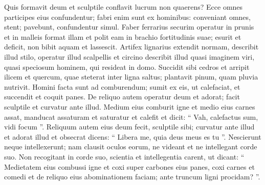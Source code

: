 \begin{biblechapter}
\begin{biblechapter}
\begin{biblechapter}
\begin{biblechapter}
\begin{biblechapter}
\begin{biblechapter}
\begin{biblechapter}
\begin{biblechapter}
\begin{biblechapter}
\begin{biblechapter}
\begin{biblechapter}
\begin{biblechapter}
\begin{biblechapter}
\begin{biblechapter}
\begin{biblechapter}
\begin{biblechapter}
\begin{biblechapter}
\begin{biblechapter}
\begin{biblechapter}
\begin{biblechapter}
\begin{biblechapter}
\begin{biblechapter}
\begin{biblechapter}
\begin{biblechapter}
\begin{biblechapter}
\begin{biblechapter}
\begin{biblechapter}
\begin{biblechapter}
\begin{biblechapter}
\begin{biblechapter}
\begin{biblechapter}
\begin{biblechapter}
\begin{biblechapter}
\begin{biblechapter}
\begin{biblechapter}
\begin{biblechapter}
\begin{biblechapter}
\begin{biblechapter}
\begin{biblechapter}
\begin{biblechapter}
\begin{biblechapter}
\begin{biblechapter}
\begin{biblechapter}
\begin{biblechapter}
\verse Quis formavit deum et sculptile conflavit lucrum non quaerens? 
\verse Ecce omnes participes eius confundentur; fabri enim sunt ex hominibus: conveniant omnes, stent; pavebunt, confundentur simul. 
\verse Faber ferrarius securim operatur in prunis et in malleis format illam et polit eam in brachio fortitudinis suae; esurit et deficit, non bibit aquam et lassescit.
 \verse Artifex lignarius extendit normam, describit illud stilo, operatur illud scalpellis et circino describit illud quasi imaginem viri, quasi speciosum hominem, qui resideat in domo. 
\verse Succidit sibi cedros et arripit ilicem et quercum, quae steterat inter ligna saltus; plantavit pinum, quam pluvia nutrivit. 
\verse Homini facta sunt ad comburendum; sumit ex eis, ut calefaciat, et succendit et coquit panes. De reliquo autem operatur deum et adorat; facit sculptile et curvatur ante illud. 
\verse Medium eius comburit igne et medio eius carnes assat, manducat assaturam et saturatur et calefit et dicit: “ Vah, calefactus sum, vidi focum ”. 
\verse Reliquum autem eius deum fecit, sculptile sibi; curvatur ante illud et adorat illud et obsecrat dicens: “ Libera me, quia deus meus es tu ”.
 \verse Nescierunt neque intellexerunt; nam clausit oculos eorum, ne videant et ne intellegant corde suo. 
\verse Non recogitant in corde suo, scientia et intellegentia carent, ut dicant: “ Medietatem eius combussi igne et coxi super carbones eius panes, coxi carnes et comedi et de reliquo eius abominationem faciam; ante truncum ligni procidam? ”. 

\end{biblechapter}
\end{biblechapter}
\end{biblechapter}
\end{biblechapter}
\end{biblechapter}
\end{biblechapter}
\end{biblechapter}
\end{biblechapter}
\end{biblechapter}
\end{biblechapter}
\end{biblechapter}
\end{biblechapter}
\end{biblechapter}
\end{biblechapter}
\end{biblechapter}
\end{biblechapter}
\end{biblechapter}
\end{biblechapter}
\end{biblechapter}
\end{biblechapter}
\end{biblechapter}
\end{biblechapter}
\end{biblechapter}
\end{biblechapter}
\end{biblechapter}
\end{biblechapter}
\end{biblechapter}
\end{biblechapter}
\end{biblechapter}
\end{biblechapter}
\end{biblechapter}
\end{biblechapter}
\end{biblechapter}
\end{biblechapter}
\end{biblechapter}
\end{biblechapter}
\end{biblechapter}
\end{biblechapter}
\end{biblechapter}
\end{biblechapter}
\end{biblechapter}
\end{biblechapter}
\end{biblechapter}
\end{biblechapter}
